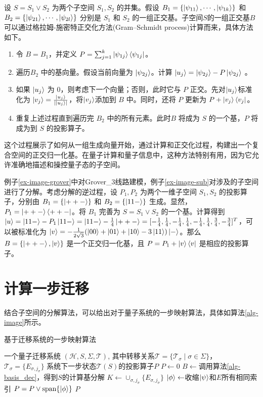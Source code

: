 设 $S=S_1\vee S_2$ 为两个子空间 $S_1,S_2$ 的并集。假设 $B_1=\{\ket{\psi_{11}},\cdots,\ket{\psi_{1k}}\}$ 和 $B_2=\{\ket{\psi_{21}},\cdots,\ket{\psi_{2l}}\}$ 分别是 $S_1$ 和 $S_2$ 的一组正交基。子空间$S$的一组正交基$B$可以通过格拉姆-施密特正交化方法(Gram–Schmidt process)计算而来，具体方法如下。
\begin{enumerate}
    \item 令 $B=B_1$，并定义 $P=\sum_{j=1}^{k}{\ket{\psi_{1j}}\bra{\psi_{1j}}}$。
    \item 遍历$B_2$ 中的基向量。假设当前向量为 $\ket{\psi_{2j}}$。计算 $\ket{u_j}=\ket{\psi_{2j}}-P\ket{\psi_{2j}}$ 。
    \item 如果 $\ket{u_j}$ 为 0，则考虑下一个向量；否则，此时它与 $P$ 正交。先对\(\ket{u_j}\)标准化为 $\ket{v_j}=\frac{\ket{u_j}}{|\ket{u_j}|}$，将\(\ket{v_j}\)添加到 $B$ 中。同时，还将 $P$ 更新为 $P+\ket{v_j}\bra{v_j}$。
    \item 重复上述过程直到遍历完 $B_2$ 中的所有元素。此时$B$ 将成为 $S$ 的一个基，$P$ 将成为到 $S$ 的投影算子。
\end{enumerate}

这个过程展示了如何从一组生成向量开始，通过计算和正交化过程，构建出一个复合空间的正交归一化基。在量子计算和量子信息中，这种方法特别有用，因为它允许准确地描述和操控量子态的子空间。

\begin{example}
    例子\ref{ex-image-grover}中对Grover\_3线路建模，例子\ref{ex-image-sub}对涉及的子空间进行了分解。考虑分解的逆过程，设 $P_1,P_2$ 为两个一维子空间 $S_1,S_2$ 的投影算子，分别由 $B_1=\{\ket{++-}\}$ 和 $B_2=\{\ket{11-}\}$ 生成。显然，$P_1=\ket{++-}\bra{++-}$。将 $B_1$ 完善为 $S=S_1\vee S_2$ 的一个基。计算得到$\ket{u}=\ket{11-}-P_1\ket{11-}=\ket{11-}-\frac{1}{4}\ket{++-}=[-\frac{1}{4},\frac{1}{4},-\frac{1}{4},\frac{1}{4},-\frac{1}{4},\frac{1}{4},\frac{3}{4},-\frac{3}{4}]^T$，可以被标准化为 $\ket{v}=-\frac{1}{2\sqrt{3}}(\ket{00}+\ket{01}+\ket{10}-3\ket{11})\ket{-}$。那么 $B=\{\ket{++-},\ket{v}\}$ 是一个正交归一化基，且 $P=P_1+\ket{v}\bra{v}$ 是相应的投影算子。
\end{example}
\section{计算一步迁移}
结合子空间的分解算法，可以给出对于量子系统的一步映射算法，具体如算法\ref{alg-image}所示。
\begin{algorithm}
\caption{基于迁移系统的一步映射算法}
\label{alg-image}
\begin{algorithmic}[1] %
\Require 一个量子迁移系统 $(\mathcal{H},S,\Sigma,\mathcal{T})$, 其中转移关系$\mathcal{T}=\{\mathcal{T}_\sigma\mid \sigma\in \Sigma\}$，  $\mathcal{T}_\sigma=\{E_{\sigma,j_\sigma}\}$
\Ensure 系统下一步状态$\mathcal{T}(S)$的投影算子$P$
\State $P \gets 0$ 
\State $B \gets $调用算法\ref{alg-basis_dec}，得到$S$的计算基分解
\State $K \gets \cup_{\sigma,j_\sigma}\{E_{\sigma,j_\sigma}\}$
    \State $\ket{\phi} \gets $收缩\(\ket{\psi}\)和\(E\)所有相同索引
    \State $P=P \vee \text{span}\{\ket{\phi}\}$
\EndFor
\State \Return $P$ 
\end{algorithmic}
\end{algorithm}

